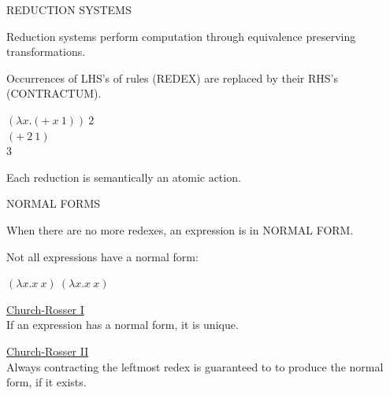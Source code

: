 \begin{slide}{}
\begin{center}
	REDUCTION SYSTEMS
\end{center}

\begin{flushleft}

Reduction systems perform computation through equivalence preserving
transformations.

Occurrences of LHS's of rules (REDEX) are replaced by their RHS's
(CONTRACTUM). 
\end{flushleft}

\begin{center}
$(\lambda x . (+ \ x \ 1)) \ 2 $ \red\\
$(+ \ 2 \ 1)$ \red\\
$3$
\end{center}

\begin{flushleft}
Each reduction is semantically an atomic action.
\end{flushleft}
\end{slide}


\begin{slide}{}
\begin{center}
	NORMAL FORMS\\[1in]
\end{center}

\begin{flushleft}
When there are no more redexes, an expression is in NORMAL FORM.

Not all expressions have a normal form:
\end{flushleft}

\begin{center}
	$(\lambda x . x \ x) \ (\lambda x . x \ x)$\\[1in]
\end{center}

\begin{flushleft}
\underline{Church-Rosser I}\\
If an expression has a normal form, it is unique.

\underline{Church-Rosser II}\\
Always contracting the leftmost redex is guaranteed to
to produce the normal form, if it exists.
\end{flushleft}
\end{slide}



